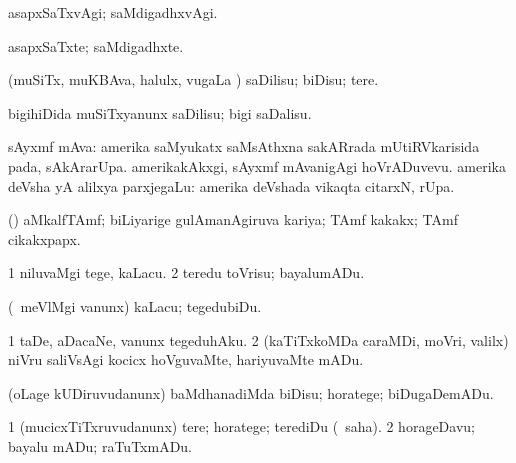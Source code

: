 {\bentry
{} 
\gl{\kirxvi}
\expl{}
\bmng
asapxSaTxvAgi; saMdigadhxvAgi. 
\emng
\eentry

\bentry
{} 
\gl{\nA}
\expl{}
\bmng
asapxSaTxte; saMdigadhxte. 
\emng
\eentry

\bentry
{} 
\gl{\sakirx}
\expl{}
\bmng
(muSiTx, muKBAva, halulx, \mo vugaLa \vi) saDilisu; biDisu; tere. 
\emng

\noindent 
\gl{\akirx}
\expl{}
\bmng
bigihiDida muSiTxyanunx saDilisu; bigi saDalisu. 
\emng
\eentry

\bentry
{}
\gl{\nA}
\expl{}
\bmng
sAyxmf mAva: 
\banum
{} amerika saMyukatx saMsAthxna sakARrada mUtiRVkarisida pada, sAkArarUpa.  amerikakAkxgi, sAyxmf mAvanigAgi hoVrADuvevu. 
 amerika deVsha yA alilxya parxjegaLu:  amerika deVshada vikaqta citarxN, rUpa. 
\eanum
\emng
\eentry

\bentry
{}
\gl{\nA}
\expl{}
\bmng
(\ame) aMkalfTAmf; biLiyarige gulAmanAgiruva kariya; TAmf kakakx; TAmf cikakxpapx. 
\emng
\eentry

\bentry
{} 
\gl{\kirx}
\expl{}
\bmng
{} 
\emng
\eentry

\bentry
{} 
\gl{\sakirx}
\expl{}
\bmng
\bnum
\num{1} niluvaMgi tege, kaLacu. 
\num{2} teredu toVrisu; bayalumADu. 
\enum
\emng

\noindent 
\gl{\akirx}
\bmng
(\sA\ meVlMgi \mo vanunx) kaLacu; tegedubiDu. 
\emng
\eentry

\bentry
{} 
\gl{\sakirx}
\bmng
\bnum
\num{1} taDe, aDacaNe, \mo vanunx tegeduhAku. 
\num{2} (kaTiTxkoMDa caraMDi, moVri, \mo valilx) niVru saliVsAgi kocicx hoVguvaMte, hariyuvaMte mADu. 
\enum
\emng
\eentry

\bentry
{} 
\gl{\sakirx}
\expl{}
\bmng
(oLage kUDiruvudanunx) baMdhanadiMda biDisu; horatege; biDugaDemADu. 
\emng
\eentry

\bentry
{} 
\gl{\sakirx}
\expl{}
\bmng
\bnum
\num{1} (mucicxTiTxruvudanunx) tere; horatege; terediDu (\akirx\ saha). 
\num{2} horageDavu; bayalu mADu; raTuTxmADu. 
\enum
\emng
\eentry

}
